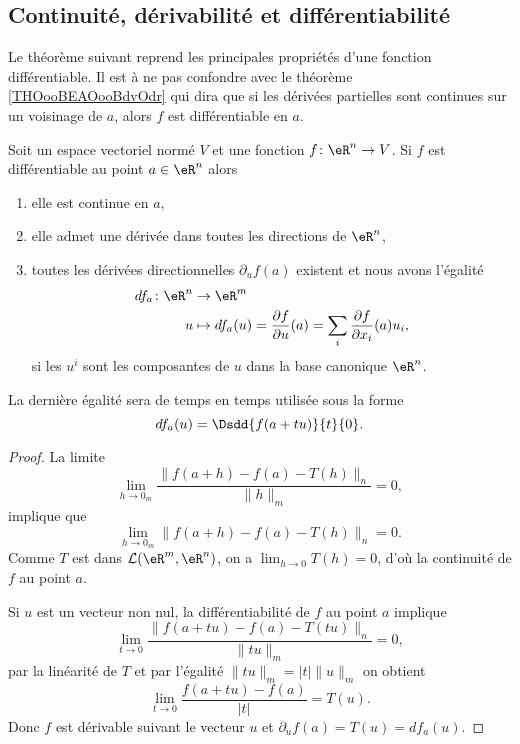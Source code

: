 \subsection{Continuité, dérivabilité et différentiabilité}

Le théorème suivant reprend les principales propriétés d'une fonction différentiable. Il est à ne pas confondre avec le théorème \ref{THOooBEAOooBdvOdr} qui dira que si les dérivées partielles sont continues sur un voisinage de $a$, alors $f$ est différentiable en $a$.
\begin{proposition}\label{diff1}\label{ThoRapPropDiffSi}
    Soit un espace vectoriel normé \( V\) et une fonction \( f\colon \eR^n\to V\). Si $f$ est différentiable au point $a\in \eR^n$ alors
    \begin{enumerate}
        \item
            elle est continue en \( a\),
        \item
            elle admet une dérivée dans toutes les directions de \( \eR^n\),
\item  toutes les dérivées directionnelles $\partial_uf(a)$ existent et nous avons l'égalité
\begin{equation}        \label{EqDiffPartRap}
    \begin{aligned}
        df_a\colon \eR^n&\to \eR^m \\
        u&\mapsto df_a(u)=\frac{ \partial f }{ \partial u }(a)=\sum_i \frac{ \partial f }{ \partial x_i }(a)u_i,
    \end{aligned}
\end{equation}
si les $u^i$ sont les composantes de $u$ dans la base canonique \( \eR^n\).

    \end{enumerate}
\end{proposition}

La dernière égalité sera de temps en temps utilisée sous la forme
\begin{equation}    \label{EqOWQSoMA}
    df_a(u)=\Dsdd{ f(a+tu) }{t}{0}.
\end{equation}

\begin{proof}
  La limite
\[
\lim_{h\to 0_m}\frac{\|f(a+h)-f(a)-T(h)\|_n}{\|h\|_m}=0,
\]
implique que
 \[
\lim_{h\to 0_m}\|f(a+h)-f(a)-T(h)\|_n=0.
\]
Comme $T$ est dans $\mathcal{L}(\eR^m,\eR^n)$, on a $\lim_{h\to 0}T(h)=0$, d'où la continuité de $f$ au point $a$.

Si $u$ est un vecteur non nul, la différentiabilité de $f$ au point $a$ implique
\[
\lim_{t\to 0}\frac{\|f(a+tu)-f(a)-T(tu)\|_n}{\|tu\|_m}=0,
\]
par la linéarité de $T$ et par l'égalité $\|tu\|_m=|t|\|u\|_m$ on obtient
\[
\lim_{t\to 0}\frac{f(a+tu)-f(a)}{|t|}= T(u).
\]
Donc $f$ est dérivable suivant le vecteur $u$ et $\partial_uf(a)=T(u)=df_a(u)$.
\end{proof}


